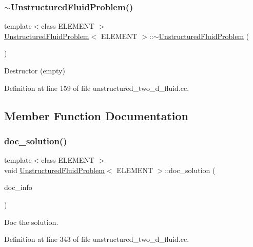 \subsubsection{\texorpdfstring{$\sim$\+Unstructured\+Fluid\+Problem()}{~UnstructuredFluidProblem()}}
{\footnotesize\ttfamily template$<$class E\+L\+E\+M\+E\+NT $>$ \\
\hyperlink{classUnstructuredFluidProblem}{Unstructured\+Fluid\+Problem}$<$ E\+L\+E\+M\+E\+NT $>$\+::$\sim$\hyperlink{classUnstructuredFluidProblem}{Unstructured\+Fluid\+Problem} (\begin{DoxyParamCaption}{ }\end{DoxyParamCaption})\hspace{0.3cm}{\ttfamily [inline]}}



Destructor (empty) 



Definition at line 159 of file unstructured\+\_\+two\+\_\+d\+\_\+fluid.\+cc.



\subsection{Member Function Documentation}
\mbox{\label{classUnstructuredFluidProblem_abcc9f0065665ae5239988b1a812e3f78}} 
\subsubsection{\texorpdfstring{doc\+\_\+solution()}{doc\_solution()}}
{\footnotesize\ttfamily template$<$class E\+L\+E\+M\+E\+NT $>$ \\
void \hyperlink{classUnstructuredFluidProblem}{Unstructured\+Fluid\+Problem}$<$ E\+L\+E\+M\+E\+NT $>$\+::doc\+\_\+solution (\begin{DoxyParamCaption}\item[{Doc\+Info \&}]{doc\+\_\+info }\end{DoxyParamCaption})}



Doc the solution. 



Definition at line 343 of file unstructured\+\_\+two\+\_\+d\+\_\+fluid.\+cc.

